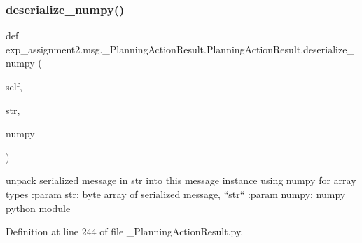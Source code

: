\mbox{\label{classexp__assignment2_1_1msg_1_1__PlanningActionResult_1_1PlanningActionResult_ac5dcfc6e0f72c5a689391eb181f6f478}} 
\subsubsection{\texorpdfstring{deserialize\+\_\+numpy()}{deserialize\_numpy()}}
{\footnotesize\ttfamily def exp\+\_\+assignment2.\+msg.\+\_\+\+Planning\+Action\+Result.\+Planning\+Action\+Result.\+deserialize\+\_\+numpy (\begin{DoxyParamCaption}\item[{}]{self,  }\item[{}]{str,  }\item[{}]{numpy }\end{DoxyParamCaption})}

\begin{DoxyVerb}unpack serialized message in str into this message instance using numpy for array types
:param str: byte array of serialized message, ``str``
:param numpy: numpy python module
\end{DoxyVerb}
 

Definition at line 244 of file \+\_\+\+Planning\+Action\+Result.\+py.


